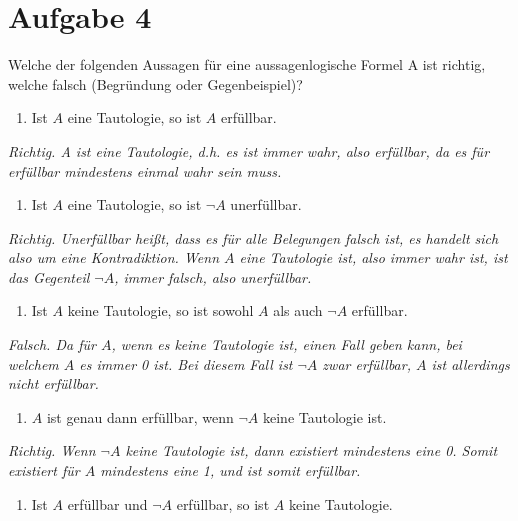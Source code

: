 \section*{Aufgabe 4}

Welche der folgenden Aussagen für eine aussagenlogische Formel A ist richtig, welche falsch (Begründung oder Gegenbeispiel)?

\begin{enumerate}[label={a)}, leftmargin=*]
\item Ist $A$ eine Tautologie, so ist $A$ erfüllbar.
\end{enumerate}

\textit{Richtig. A ist eine Tautologie, d.h. es ist immer wahr, also erfüllbar, da es für erfüllbar mindestens einmal wahr sein muss.}

\begin{enumerate}[label={b)}, leftmargin=*]
\item Ist $A$ eine Tautologie, so ist $\lnot A$ unerfüllbar.
\end{enumerate}

\textit{Richtig. Unerfüllbar heißt, dass es für alle Belegungen falsch ist, es handelt sich also um eine Kontradiktion. Wenn $A$ eine Tautologie ist, also immer wahr ist, ist das Gegenteil $\lnot A$, immer falsch, also unerfüllbar.}

\begin{enumerate}[label={c)}, leftmargin=*]
\item Ist $A$ keine Tautologie, so ist sowohl $A$ als auch $\lnot A$ erfüllbar.
\end{enumerate}

\textit{Falsch. Da für $A$, wenn es keine Tautologie ist, einen Fall geben kann, bei welchem $A$ es immer 0 ist. Bei diesem Fall ist $\lnot A$ zwar erfüllbar, $A$ ist allerdings nicht erfüllbar.}

\begin{enumerate}[label={d)}, leftmargin=*]
\item $A$ ist genau dann erfüllbar, wenn $\lnot A$ keine Tautologie ist.
\end{enumerate}

\textit{Richtig. Wenn $\lnot A$ keine Tautologie ist, dann existiert mindestens eine 0. Somit existiert für $A$ mindestens eine 1, und ist somit erfüllbar.}

\begin{enumerate}[label={e)}, leftmargin=*]
\item Ist $A$ erfüllbar und $\lnot A$ erfüllbar, so ist $A$ keine Tautologie.
\end{enumerate}

